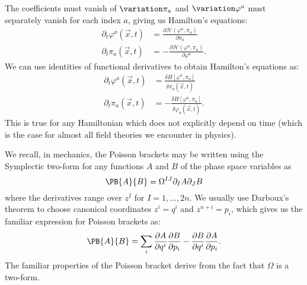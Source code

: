 The coefficients must vanish of $\variation\pi_{a}$ and
$\variation\varphi^{a}$ must separately vanish for each index $a$,
giving us Hamilton's equations:
\begin{subequations}
\begin{align}
\partial_{t}\varphi^{a}(\vec{x},t)&=\frac{\partial\mathcal{H}(\varphi^{a},\pi_{a})}{\partial\pi_{a}}\\
\partial_{t}\pi_{a}(\vec{x},t)&=-\frac{\partial\mathcal{H}(\varphi^{a},\pi_{a})}{\partial\varphi^{a}}.
\end{align}
\end{subequations}
We can use identities of functional derivatives to obtain Hamilton's
equations as:
\begin{subequations}
\begin{align}
\partial_{t}\varphi^{a}(\vec{x},t)&=\frac{\delta H[\varphi^{a},\pi_{a}]}{\delta\pi_{a}(\vec{x},t)}\\
\partial_{t}\pi_{a}(\vec{x},t)&=-\frac{\delta H[\varphi^{a},\pi_{a}]}{\delta\varphi_{a}(\vec{x},t)}.
\end{align}
\end{subequations}
This is true for any Hamiltonian which does not explicitly depend on
time (which is the case for almost all field theories we encounter in physics).

We recall, in mechanics, the Poisson brackets may be written using the
Symplectic two-form for any functions $A$ and $B$ of the phase space
variables as
\begin{equation}
\PB{A}{B} = \Omega^{IJ}\partial_{I}A\partial_{J}B
\end{equation}
where the derivatives range over $z^{I}$ for $I=1,\dots,2n$. We usually use Darboux's
theorem to choose canonical coordinates $z^{i}=q^{i}$ and
$z^{n+i}=p_{i}$, which gives us the familiar expression for Poisson
brackets as:
\begin{equation}
\PB{A}{B} = \sum_{i}\frac{\partial A}{\partial q^{i}}\frac{\partial B}{\partial p_{i}}
- \frac{\partial B}{\partial q^{i}}\frac{\partial A}{\partial p_{i}}.
\end{equation}
The familiar properties of the Poisson bracket derive from the fact that
$\Omega$ is a two-form.

